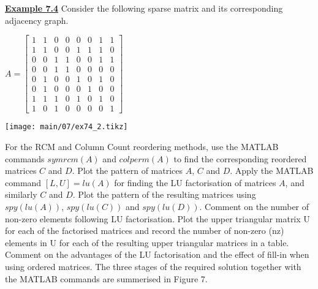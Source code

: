   \vskip 4pt
  \noindent
  {\bf\underline {Example 7.4}}
  \vskip 2pt
  \noindent
  Consider the following sparse matrix and its corresponding adjacency graph.
  \vskip 1pt
  \noindent
  \begin{table}[H]
    \begin{minipage}[b]{0.5\linewidth}
      \vskip 2pt
      $A=
          \begin{bmatrix}
        1 & 1 & 0 & 0 & 0 & 0 & 1 & 1 \\
        1 & 1 & 0 & 0 & 1 & 1 & 1 & 0 \\
        0 & 0 & 1 & 1 & 0 & 0 & 1 & 1 \\
        0 & 0 & 1 & 1 & 0 & 0 & 0 & 0 \\
        0 & 1 & 0 & 0 & 1 & 0 & 1 & 0 \\
        0 & 1 & 0 & 0 & 0 & 1 & 0 & 0 \\
        1 & 1 & 1 & 0 & 1 & 0 & 1 & 0 \\
        1 & 0 & 1 & 0 & 0 & 0 & 0 & 1
      \end{bmatrix}$
      \vspace{-5mm}
    \end{minipage}
    \begin{minipage}[b]{0.59\linewidth}
      \texttt{[image: main/07/ex74\_2.tikz]}
    \end{minipage}
  \end{table}
  \vskip 10pt
  
  For the RCM and Column Count reordering methods, use the MATLAB commands
  $symrcm(A)$ and $colperm(A)$ to find the corresponding reordered matrices $C$
  and $D$. Plot the pattern of matrices $A$, $C$ and $D$. Apply the MATLAB command
  $[L,U]=lu(A)$ for finding the LU factorisation of matrices $A$, and similarly $C$
  and $D$. Plot the pattern of the resulting matrices using $spy(lu(A))$,
  $spy(lu(C))$ and $spy(lu(D))$. Comment on the number of non-zero elements
  following LU factorisation. Plot the upper triangular matrix U for each of the
  factorised matrices and record the number of non-zero (nz) elements in U for
  each of the resulting upper triangular matrices  in a table. Comment on the
  advantages of the LU factorisation and the effect of fill-in when using ordered
  matrices.
  \rmfamily
  The three stages of the required solution together with the MATLAB commands are
  summerised in Figure 7.
  
